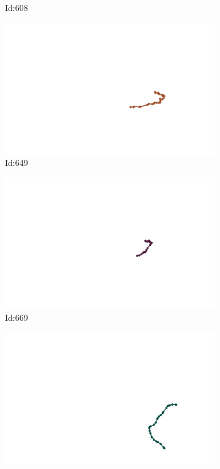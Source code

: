 \documentclass[12pt,twoside]{report}
\begin{document}
\begin{figure}
\begin{subfigure}[b]{0.20\textwidth}
\caption{Id:608}
\end{subfigure}
\begin{subfigure}[b]{0.20\textwidth}
\centering
\includegraphics[width=\textwidth]{../trajectories/649.png}
\caption{Id:649}
\end{subfigure}
\begin{subfigure}[b]{0.20\textwidth}
\centering
\includegraphics[width=\textwidth]{../trajectories/669.png}
\caption{Id:669}
\end{subfigure}
\begin{subfigure}[b]{0.20\textwidth}
\centering
\includegraphics[width=\textwidth]{../trajectories/713.png}

\end{subfigure}
\end{figure}
\end{document}
